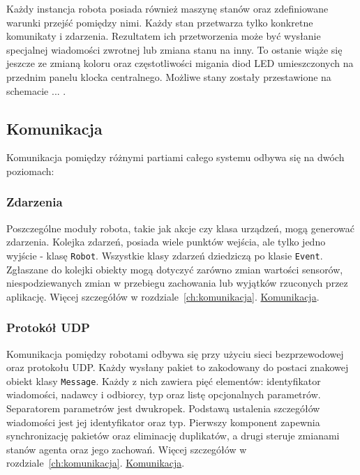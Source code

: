 Każdy instancja robota posiada również maszynę stanów oraz zdefiniowane warunki przejść pomiędzy nimi. Każdy stan przetwarza tylko konkretne komunikaty i zdarzenia. Rezultatem ich przetworzenia może być wysłanie specjalnej wiadomości zwrotnej lub zmiana stanu na inny. To ostanie wiąże się jeszcze ze zmianą koloru oraz częstotliwości migania diod LED umieszczonych na przednim panelu klocka centralnego. Możliwe stany zostały przestawione na schemacie ... .


\subsection{Komunikacja}

\indent \indent Komunikacja pomiędzy różnymi partiami całego systemu odbywa się na dwóch poziomach:

\subsubsection{Zdarzenia}

Poszczególne moduły robota, takie jak akcje czy klasa urządzeń, mogą generować zdarzenia. Kolejka zdarzeń, posiada wiele punktów wejścia, ale tylko jedno wyjście - klasę {\tt Robot}. Wszystkie klasy zdarzeń dziedziczą po klasie {\tt Event}. Zgłaszane do kolejki obiekty mogą dotyczyć zarówno zmian wartości sensorów, niespodziewanych zmian w przebiegu zachowania lub wyjątków rzuconych przez aplikację. Więcej szczegółów w rozdziale~\ref{ch:komunikacja}. \hyperref[ch:komunikacja]{Komunikacja}. 

\subsubsection{Protokół UDP}

Komunikacja pomiędzy robotami odbywa się przy użyciu sieci bezprzewodowej oraz protokołu UDP. Każdy wysłany pakiet to zakodowany do postaci znakowej obiekt klasy {\tt Message}. Każdy z nich zawiera pięć elementów: identyfikator wiadomości, nadawcy i odbiorcy, typ oraz listę opcjonalnych parametrów. Separatorem parametrów jest dwukropek. Podstawą ustalenia szczegółów wiadomości jest jej identyfikator oraz typ. Pierwszy komponent zapewnia synchronizację pakietów oraz eliminację duplikatów, a drugi steruje zmianami stanów agenta oraz jego zachowań. Więcej szczegółów w rozdziale~\ref{ch:komunikacja}. \hyperref[ch:komunikacja]{Komunikacja}.


